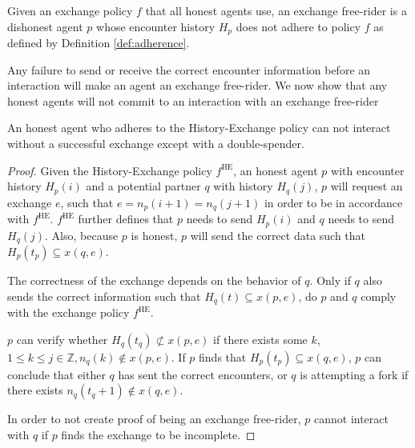 \begin{defn}
    \label{def:gos_free-rider}
    Given an exchange policy $f$ that all honest agents use, an exchange free-rider is a dishonest 
    agent $p$ whose encounter history $H_p$ does not adhere to policy $f$ as defined by Definition \ref{def:adherence}.
\end{defn}

Any failure to send or receive the correct encounter information before an interaction will make 
an agent an exchange free-rider.
We now show that any honest agents will not commit to an interaction with an exchange free-rider

\begin{thm}
    \label{thm:no_interaction}
    An honest agent who adheres to the History-Exchange policy can not interact without a successful 
    exchange except with a double-spender.
\end{thm}
\begin{proof}
    Given the History-Exchange policy $f^{\text{HE}}$, an honest agent $p$ with encounter history $H_p(i)$ and a potential 
    partner $q$ with history $H_q(j)$, $p$ will request an exchange $e$, such 
    that $e = n_p(i+1) = n_q(j+1)$ in order to be in accordance with $f^{\text{HE}}$. 
    $f^{\text{HE}}$ further defines that $p$ needs to send $H_p(i)$ and $q$ needs to send $H_q(j)$.
    Also, because $p$ is honest, $p$ will send the correct data such that $H_p(t_p) \subseteq x(q,e)$. 
    
    The correctness of the exchange depends on the behavior of $q$.
    Only if $q$ also sends the correct information such that $H_q(t) \subseteq x(p,e)$, do $p$ and $q$ comply with 
    the exchange policy $f^{\text{HE}}$. 
    
    $p$ can verify whether $H_q(t_q) \not\subset x(p,e)$ if there exists some $k$, $1 \leq k \leq j \in \mathbb{Z}, n_q(k) \notin x(p,e)$. If 
    $p$ finds that $H_p(t_p) \subseteq x(q,e)$, $p$ can conclude that either $q$ has sent the correct
    encounters, or $q$ is attempting a fork if there exists $n_q(t_q+1) \notin x(q,e)$.
    
    In order to not create proof of being an exchange free-rider, $p$ cannot interact with $q$ if 
    $p$ finds the exchange to be incomplete.
\end{proof}

